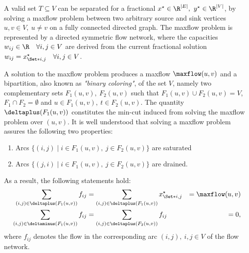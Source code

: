 A valid set $T \subseteq V$ can be separated for a fractional $x^\star \in \R^{|E|},\ y^\star \in \R^{|V|}$,
by solving a
maxflow problem between two arbitrary source and sink vertices $u, v \in V,\ u \ne v$ on a fully connected directed graph.
The maxflow problem is represented by a directed symmetric flow network,
where the capacities $w_{ij} \in \R \quad \forall i, j \in V$
are derived from the current fractional solution $w_{ij} = x^\star_{\Set*{i, j}} \quad \forall i, j \in V$.

A solution to the maxflow problem
produces a maxflow $\maxflow(u, v)$ and a bipartition, also known as \textit{"binary coloring"},
of the set $V$,
namely two complementary sets $F_1(u, v),\ F_2(u, v)$
such that $F_1(u, v) \cup F_2(u, v) = V$, $F_1 \cap F_2 = \emptyset$ and $u \in F_1(u, v),\ t \in F_2(u, v)$.
The quantity $\deltaplus(F_1(u, v))$ constitutes the min-cut induced from solving the maxflow problem over $(u, v)$.
It is well understood that solving a maxflow problem assures the following two properties:
\begin{enumerate}
	\item Arcs $\{ (i, j) \mid i \in F_1(u, v),\ j \in F_2(u, v) \}$ are saturated
	\item Arcs $\{ (j, i) \mid i \in F_1(u, v),\ j \in F_2(u, v) \}$ are drained.
\end{enumerate}
As a result, the following statements hold:
\begin{align}
	\sum_{(i, j) \in \deltaplus(F_1(u, v))} f_{ij}  & = \sum_{(i, j) \in \deltaplus(F_1(u, v))} x^\star_{\Set*{i, j}} & = \maxflow(u, v) \\
	\sum_{(i, j) \in \deltaminus(F_1(u, v))} f_{ij} & = \sum_{(i, j) \in \deltaplus(F_2(u, v))} f_{ij}                & = 0,
\end{align}
where $f_{ij}$ denotes the flow in the corresponding arc $(i, j),\ i, j \in V$ of the flow network.

